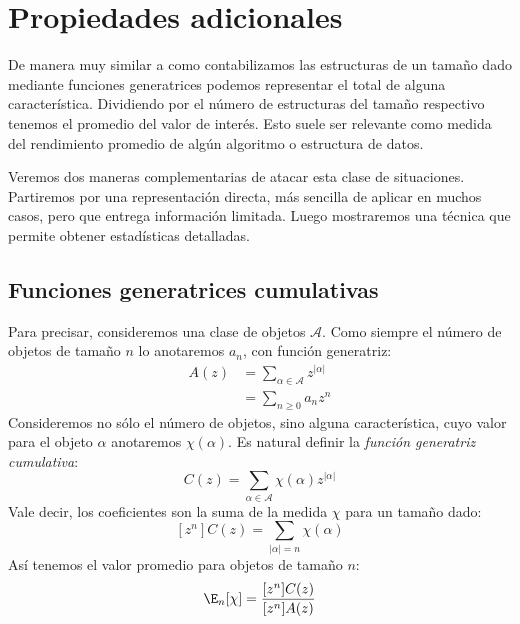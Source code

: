 %

\chapter{Propiedades adicionales}
\label{cha:propiedades-adicionales}

  De manera muy similar
  a como contabilizamos las estructuras de un tamaño dado
  mediante funciones generatrices
  podemos representar el total de alguna característica.
  Dividiendo por el número de estructuras del tamaño respectivo
  tenemos el promedio del valor de interés.%
  Esto suele ser relevante como medida del rendimiento promedio
  de algún algoritmo o estructura de datos.%

  Veremos dos maneras complementarias de atacar esta clase de situaciones.
  Partiremos por una representación directa,
  más sencilla de aplicar en muchos casos,
  pero que entrega información limitada.
  Luego mostraremos una técnica que permite obtener estadísticas detalladas.

\section{Funciones generatrices cumulativas}
\label{sec:generatrices-cumulativas}

  Para precisar,
  consideremos una clase de objetos \(\mathcal{A}\).
  Como siempre el número de objetos de tamaño \(n\)
  lo anotaremos \(a_n\),
  con función generatriz:
  \begin{align}
    A(z)
      &= \sum_{\alpha \in \mathcal{A}} z^{\lvert \alpha \rvert}
	    \label{eq:A-def} \\
      &= \sum_{n \ge 0} a_n z^n
	    \label{eq:A-an}
  \end{align}
  Consideremos no sólo el número de objetos,
  sino alguna característica,
  cuyo valor para el objeto \(\alpha\) anotaremos \(\chi(\alpha)\).
  Es natural definir la \emph{función generatriz cumulativa}:%
  \begin{equation}
    \label{eq:cogf-def}
    C(z)
      = \sum_{\alpha \in \mathcal{A}} \chi(\alpha) z^{\lvert \alpha \rvert}
  \end{equation}
  Vale decir,
  los coeficientes son la suma de la medida \(\chi\)
  para un tamaño dado:
  \begin{equation}
    \label{eq:cogf-coefficient}
    [z^n] C(z)
      = \sum_{\lvert \alpha \rvert = n} \chi(\alpha)
  \end{equation}
  Así tenemos el valor promedio para objetos de tamaño \(n\):%
  \begin{equation}
    \label{eq:chi-expected}
    \E_n[\chi]
      = \frac{[z^n] C(z)}{[z^n] A(z)}
  \end{equation}

